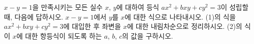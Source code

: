 $x-y=1$을 만족시키는 모든 실수 $x$, $y$에 대하여 등식 $ax^2+bxy+cy^2=3$이 성립할 때, 다음에 답하시오. 
 $x-y=1$에서 $y$를 $x$에 대한 식으로 나타내시오.
 (1)의 식을 $ax^2+bxy+cy^2=3$에 대입한 후 좌변을 $x$에 대한 내림차순으로 정리하시오.
 (2)의 식이 $x$에 대한 항등식이 되도록 하는 $a$, $b$, $c$의 값을 구하시오.
